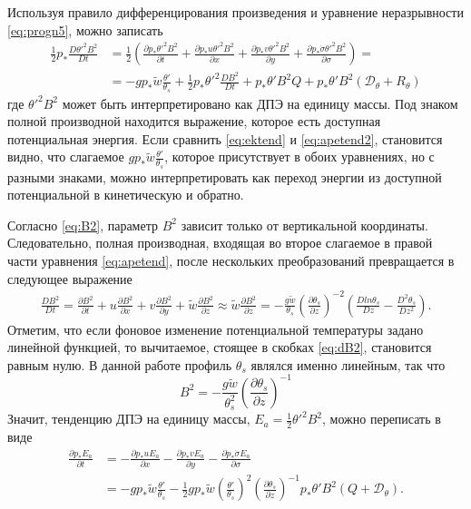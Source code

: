 Используя правило дифференцирования произведения и уравнение неразрывности \eqref{eq:progn5}, можно записать
\begin{align}
\frac{1}{2}p_*\frac{D\theta'^2B^2}{Dt}&=\frac{1}{2}\left(\frac{\partial{p_*\theta'^2B^2}}{\partial{t}}+\frac{\partial{p_*u\theta'^2B^2}}{\partial{x}}+\frac{\partial{p_*v\theta'^2B^2}}{\partial{y}}+\frac{\partial{p_*\dot{\sigma}\theta'^2B^2}}{\partial{\sigma}}\right)= \nonumber\\ 
&=-gp_*\tilde{w}\frac{\theta'}{\theta_s}+\frac{1}{2}p_*\theta'^2\frac{DB^2}{Dt}+p_*\theta'B^2Q+p_*\theta'B^2(\mathcal{D}_{\theta}+R_{\theta}) \label{eq:apetend}
\end{align}
где $\theta'^2B^2$ может быть интерпретировано как ДПЭ на единицу массы. Под знаком полной производной находится выражение, которое есть доступная потенциальная энергия. Если сравнить \eqref{eq:ektend} и \eqref{eq:apetend2}, становится видно, что слагаемое $gp_*\tilde{w}\frac{\theta'}{\theta_s}$, которое присутствует в обоих уравнениях, но с разными знаками, можно интерпретировать как переход энергии из доступной потенциальной в кинетическую и обратно.

Согласно \eqref{eq:B2}, параметр $B^2$ зависит только от вертикальной координаты. Следовательно, полная производная, входящая во второе слагаемое в правой части уравнения \eqref{eq:apetend}, после нескольких преобразований превращается в следующее выражение
\begin{align}
\frac{DB^2}{Dt}=\frac{\partial{B^2}}{\partial{t}}+u \frac{\partial{B^2}}{\partial{x}}+v\frac{\partial{B^2}}{\partial{y}}+\tilde{w}\frac{\partial{B^2}}{\partial{z}} \approx \tilde{w}\frac{\partial{B^2}}{\partial{z}}=-\frac{g\tilde{w}}{\theta_s}\left(\frac{\partial\theta_s}{\partial{z}}\right)^{-2}\left(\frac{Dln\theta_s}{Dz}-\frac{D^2\theta_s}{Dz^2}\right) \label{eq:dB2}.
\end{align}
Отметим, что если фоновое изменение потенциальной температуры задано линейной функцией, то вычитаемое, стоящее в скобках \eqref{eq:dB2}, становится равным нулю. В данной работе профиль $\theta_s$ являлся именно линейным, так что 
\begin{equation}
B^2=-\frac{g\tilde{w}}{\theta_s^2}\left(\frac{\partial\theta_s}{\partial{z}}\right)^{-1}
\end{equation}
Значит, тенденцию ДПЭ на единицу массы, $E_a=\frac{1}{2}\theta'^2B^2$, можно переписать в виде
\begin{align}
\frac{\partial p_*E_a}{\partial{t}}&=-\frac{\partial{p_*uE_a}}{\partial{x}}-\frac{\partial{p_*vE_a}}{\partial{y}}-\frac{\partial{p_*\dot{\sigma}E_a}}{\partial{\sigma}} \nonumber\\ 
&=-gp_*\tilde{w}\frac{\theta'}{\theta_s}-\frac{1}{2}gp_*\tilde{w}\left(\frac{\theta'}{\theta_s}\right)^2\left(\frac{\partial\theta_s}{\partial{z}}\right)^{-1}p_*\theta'B^2(Q+\mathcal{D}_\theta) \label{eq:apetend2}.
\end{align} %

